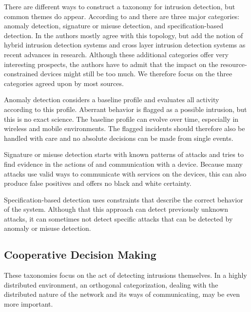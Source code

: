 \documentclass[conference]{IEEEtran}
\begin{document}
There are different ways to construct a taxonomy for intrusion detection, but
common themes do appear. According to \cite{mishra2004intrusion} and
\cite{ioannis2007towards} there are three major categories: anomaly detection,
signature or misuse detection, and specification-based detection. In
\cite{alrajeh2013intrusion} the authors mostly agree with this topology, but
add the notion of hybrid intrusion detection systems and cross layer intrusion
detection systems as recent advances in research. Although these additional
categories offer very interesting prospects, the authors have to admit that the
impact on the resource-constrained devices might still be too much. We
therefore focus on the three categories agreed upon by most sources.

\begin{LaTeXdescription}
  
  \item[Anomaly detection] considers a baseline profile and evaluates all
  activity according to this profile. Aberrant behavior is flagged as a
  possible intrusion, but this is no exact science. The baseline profile can
  evolve over time, especially in wireless and mobile environments. The flagged
  incidents should therefore also be handled with care and no absolute
  decisions can be made from single events.
  
  \item[Signature or misuse detection] starts with known patterns of attacks
  and tries to find evidence in the actions of and communication with a device.
  Because many attacks use valid ways to communicate with services on the
  devices, this can also produce false positives and offers no black and white
  certainty.
  
  \item[Specification-based detection] uses constraints that describe the
  correct behavior of the system. Although that this approach can detect
  previously unknown attacks, it can sometimes not detect specific attacks that
  can be detected by anomaly or misuse detection.
  
\end{LaTeXdescription}

\subsection*{Cooperative Decision Making}
\label{coorperative}

These taxonomies focus on the act of detecting intrusions themselves. In a
highly distributed environment, an orthogonal categorization, dealing with the
distributed nature of the network and its ways of communicating, may be even
more important.
\end{document}
